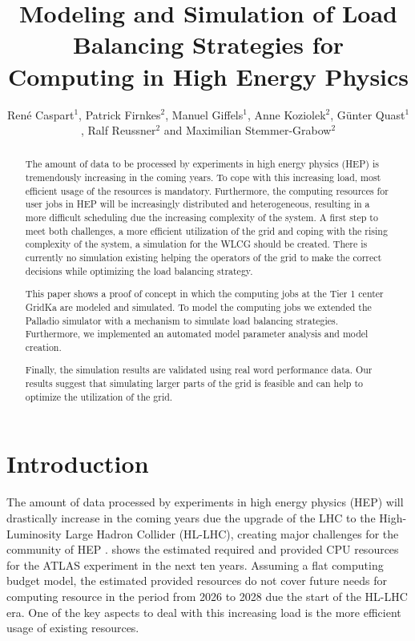 \documentclass[a4paper]{jpconf}
\begin{document}
\title{Modeling and Simulation of Load Balancing Strategies for Computing in High Energy Physics}

\author{Ren\'e Caspart${}^{1}$,
	Patrick Firnkes${}^{2}$,
	Manuel Giffels${}^{1}$,
	Anne Koziolek${}^{2}$,
	G\"unter Quast${}^{1}$,
	Ralf Reussner${}^{2}$ and 
	Maximilian Stemmer-Grabow${}^{2}$}

\address{
	${}^{1}$Institute for Experimental Particle Physics (ETP) \\
	${}^{2}$Institute for Program Structures and Data Organization (IPD) \\
	at Karlsruhe Institute of Technology (KIT), Karlsruhe, Germany}


\begin{abstract}
	The amount of data to be processed by experiments in high energy physics (HEP) is tremendously increasing in the coming years. To cope with this increasing load, most efficient usage of the resources is mandatory. Furthermore, the computing resources for user jobs in HEP will be increasingly distributed and heterogeneous, resulting in a more difficult scheduling due the increasing complexity of the system. 
	A first step to meet both challenges, a more efficient utilization of the grid and coping with the rising complexity of the system, a simulation for the WLCG should be created. There is currently no simulation existing helping the operators of the grid to make the correct decisions while optimizing the load balancing strategy.
	
	This paper shows a proof of concept in which the computing jobs at the Tier 1 center GridKa are modeled and simulated. To model the computing jobs we extended the Palladio simulator with a mechanism to simulate load balancing strategies. Furthermore, we implemented an automated model parameter analysis and model creation.
	
	Finally, the simulation results are validated using real word performance data. Our results suggest that simulating larger parts of the grid is feasible and can help to optimize the utilization of the grid.
\end{abstract}


\section{Introduction}
\label{sec:intro}

The amount of data processed by experiments in high energy physics (HEP) will drastically increase in the coming years due the upgrade of the LHC to the High-Luminosity Large Hadron Collider (HL-LHC), creating major challenges for the community of HEP \cite{community}.
 shows the estimated required and provided CPU resources for the ATLAS experiment in the next ten years. Assuming a flat computing budget model, the estimated provided resources do not cover future needs for computing resource in the period from 2026 to 2028 due the start of the HL-LHC era. One of the key aspects to deal with this increasing load is the more efficient usage of existing resources.
\end{document}
